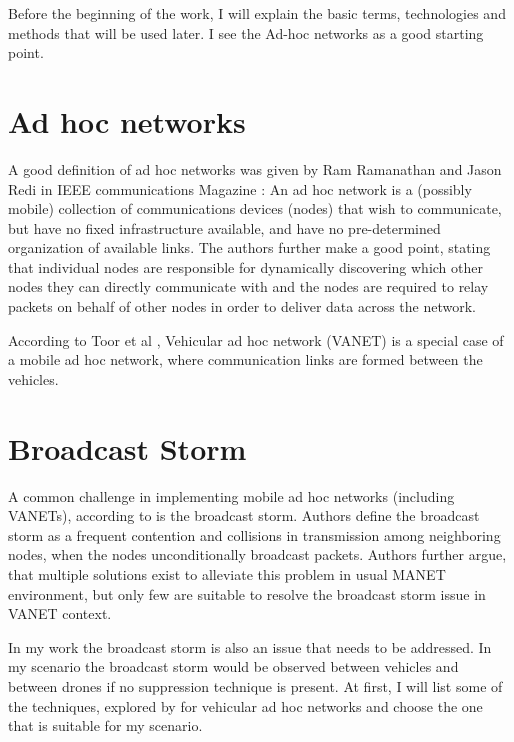 \documentclass[]{nsm-thesis}
\begin{document}
Before the beginning of the work, I will explain the basic terms, technologies and methods that will be used later. I see the Ad-hoc networks as a good starting point.

\section{Ad hoc networks}

A good definition of ad hoc networks was given by Ram Ramanathan and Jason Redi in IEEE communications Magazine \cite{ramanathan2002brief}: An ad hoc network is a (possibly mobile) collection of communications devices (nodes) that wish to communicate, but have no fixed infrastructure available, and have no pre-determined organization of available links. The authors further make a good point, stating that individual nodes are responsible for dynamically discovering which other nodes they can directly communicate with and the nodes are required to relay packets on behalf of other nodes in order to deliver data across the network.

According to Toor et al \cite{toor2008}, Vehicular ad hoc network (\ac{VANET}) is a special case of a mobile ad hoc network, where communication links are formed between the vehicles.



\section{Broadcast Storm}

A common challenge in implementing mobile ad hoc networks (including \acp{VANET}), according to \textcite{wisitrophan2007} is the broadcast storm. Authors define the broadcast storm as a frequent contention and collisions in transmission among neighboring nodes, when the nodes unconditionally broadcast packets. Authors further argue, that multiple solutions exist to alleviate this problem in usual \ac{MANET} environment, but only few are suitable to resolve the broadcast storm issue in \ac{VANET} context.

In my work the broadcast storm is also an issue that needs to be addressed. In my scenario the broadcast storm would be observed between vehicles and between drones if no suppression technique is present. At first, I will list some of the techniques, explored by \textcite{wisitrophan2007} for vehicular ad hoc networks and choose the one that is suitable for my scenario.
\end{document}
